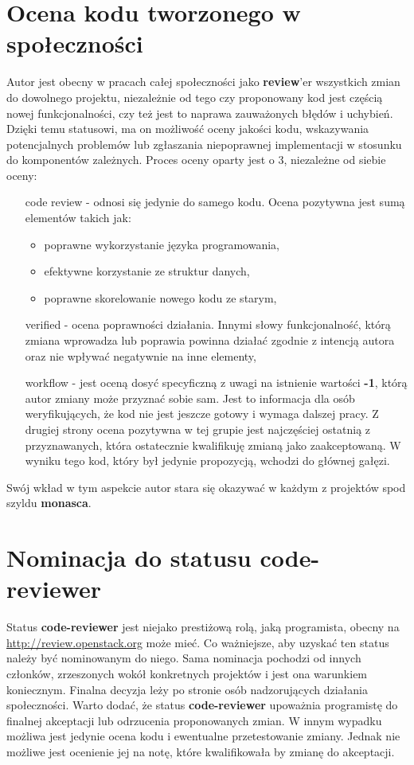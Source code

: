 \section{Ocena kodu tworzonego w społeczności}
    Autor jest obecny w pracach całej społeczności jako \textbf{review}'er wszystkich zmian do dowolnego projektu, 
    niezależnie od tego czy proponowany kod jest częścią nowej funkcjonalności, czy też jest to naprawa zauważonych błędów i 
    uchybień. Dzięki temu statusowi, ma on możliwość oceny jakości kodu, wskazywania potencjalnych problemów lub zgłaszania 
    niepoprawnej implementacji w stosunku do komponentów zależnych.
    Proces oceny oparty jest o 3, niezależne od siebie oceny:
    \begin{itemize}
        \item[code review] - odnosi się jedynie do samego kodu. Ocena pozytywna jest sumą elementów takich jak:
        \begin{itemize}
            \item poprawne wykorzystanie języka programowania,
            \item efektywne korzystanie ze struktur danych,
            \item poprawne skorelowanie nowego kodu ze starym,
        \end{itemize}
        \item[verified] -  ocena poprawności działania. Innymi słowy funkcjonalność, którą zmiana wprowadza lub poprawia powinna działać
        zgodnie z intencją autora oraz nie wpływać negatywnie na inne elementy,
        \item[workflow] - jest oceną dosyć specyficzną z uwagi na istnienie wartości \textbf{-1}, którą autor zmiany może przyznać sobie sam.
        Jest to informacja dla osób weryfikujących, że kod nie jest jeszcze gotowy i wymaga dalszej pracy. Z drugiej strony ocena pozytywna w tej grupie
        jest najczęściej ostatnią z przyznawanych, która ostatecznie kwalifikuję zmianą jako zaakceptowaną. W wyniku tego kod, który był
        jedynie propozycją, wchodzi do głównej gałęzi.
    \end{itemize}
    Swój wkład w tym aspekcie autor stara się okazywać w każdym z projektów spod szyldu \textbf{monasca}.

\section{Nominacja do statusu code-reviewer}
    Status \textbf{code-reviewer} jest niejako prestiżową rolą, jaką programista, obecny na \\
    \url{http://review.openstack.org} może mieć. Co ważniejsze, aby uzyskać ten status należy być nominowanym do niego. Sama 
    nominacja pochodzi od innych członków, zrzeszonych wokół konkretnych projektów i jest ona warunkiem koniecznym. 
    Finalna decyzja leży po stronie osób nadzorujących działania społeczności.
    Warto dodać, że status \textbf{code-reviewer} upoważnia programistę do finalnej akceptacji lub odrzucenia proponowanych 
    zmian. W innym wypadku możliwa jest jedynie ocena kodu i ewentualne przetestowanie zmiany. Jednak nie możliwe jest 
    ocenienie jej na notę, które kwalifikowała by zmianę do akceptacji.